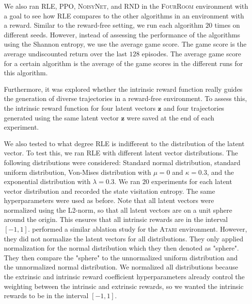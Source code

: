 \documentclass[10pt]{article} %
\begin{document}
We also ran \textsc{RLE}, \textsc{PPO}, \textsc{NoisyNet}, and \textsc{RND} in the \textsc{FourRoom} environment with a goal to see how \textsc{RLE} compares to the other algorithms in an environment with a reward. Similar to the reward-free setting, we run each algorithm $20$ times on different seeds. However, instead of assessing the performance of the algorithms using the Shannon entropy, we use the average game score. The game score is the average undiscounted return over the last $128$ episodes. The average game score for a certain algorithm is the average of the game scores in the different runs for this algorithm.

Furthermore, it was explored whether the intrinsic reward function really guides the generation of diverse trajectories in a reward-free environment. To assess this, the intrinsic reward function for four latent vectors $\textbf{z}$ and four trajectories generated using the same latent vector $\textbf{z}$ were saved at the end of each experiment. 

We also tested to what degree \textsc{RLE} is indifferent to the distribution of the latent vector. To test this, we ran \textsc{RLE} with different latent vector distributions. The following distributions were considered: Standard normal distribution, standard uniform distribution, Von-Mises distribution with $\mu=0$ and $\kappa=0.3$, and the exponential distribution with $\lambda=0.3$. We ran $20$ experiments for each latent vector distribution and recorded the state visitation entropy. The same hyperparameters were used as before. Note that all latent vectors were normalized using the L2-norm, so that all latent vectors are on a unit sphere around the origin. This ensures that all intrinsic rewards are in the interval $[-1,1]$. \cite{rle-paper} performed a similar ablation study for the \textsc{Atari} environment. However, they did not normalize the latent vectors for all distributions. They only applied normalization for the normal distribution which they then denoted as "sphere". They then compare the "sphere" to the unnormalized uniform distribution and the unnormalized normal distribution. We normalized all distributions because the extrinsic and intrinsic reward coefficient hyperparameters already control the weighting between the intrinsic and extrinsic rewards, so we wanted the intrinsic rewards to be in the interval $[-1,1]$.
\end{document}
